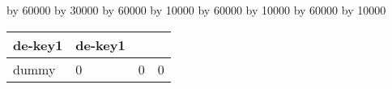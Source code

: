 
\begin{table}[htb]
\centering

\ifthenelse{\isundefined{\tabLenA}}{\newlength{\tabLenA}}{}
\ifthenelse{\isundefined{\tabLenB}}{\newlength{\tabLenB}}{}
\ifthenelse{\isundefined{\tabLenC}}{\newlength{\tabLenC}}{}
\ifthenelse{\isundefined{\tabLenD}}{\newlength{\tabLenD}}{}

\setlength{\tabLenA}{\textwidth}
\setlength{\tabLenB}{\textwidth}
\setlength{\tabLenC}{\textwidth}
\setlength{\tabLenD}{\textwidth}

\divide\tabLenA by 60000
\multiply\tabLenA by 30000
\divide\tabLenB by 60000
\multiply\tabLenB by 10000
\divide\tabLenC by 60000
\multiply\tabLenC by 10000
\divide\tabLenD by 60000
\multiply\tabLenD by 10000
\begin{tabular}{|p{\tabLenA}|p{\tabLenB}|p{\tabLenC}|p{\tabLenD}|}
\hline

de-key1
&

de-key1
\\
\hline
\hline

dummy
&

0
&

0
&

0
\\
\hline
\end{tabular}
\end{table}
